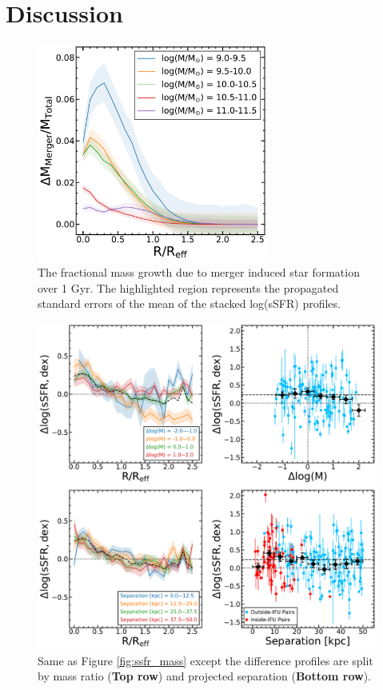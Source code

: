 \documentclass[iop,revtex4,twocolumn,apj,numberedappendix,appendixfloats]{emulateapj}
\begin{document}
\section{Discussion}\label{sec:disc}
\begin{figure}
\centering
\includegraphics[width=3in]{fig/mass_gain.pdf}
\caption[The fractional mass gain due to merger induced star formation.]{The fractional mass growth due to merger induced star formation over 1 Gyr. The highlighted region represents the propagated standard errors of the mean of the stacked log(sSFR) profiles. }
\label{fig:mass_gain_sum}
\end{figure}

\begin{figure}
\centering
\includegraphics[width=\linewidth]{fig/ssfr_partial.pdf}
\caption[]{Same as Figure \ref{fig:ssfr_mass} except the difference profiles are split by mass ratio (\textbf{Top row}) and projected separation (\textbf{Bottom row}). }
\label{fig:ssfr_dmsep}
\end{figure}
\end{document}
